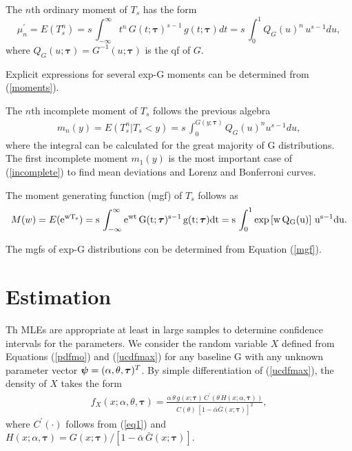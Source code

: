 \documentclass[12pt]{article}
\newcommand{\psin}{{\mbox{\boldmath $\psi$}}}
\begin{document}
The $n$th ordinary moment of $T_s$ has the form
\begin{equation}\label{moments}
\mu_n^{\prime}=E(T_s^n)=s\,\int_{-\infty}^{\infty} t^n\,G(t;\bm{\tau})^{s-1}\,g(t;\bm{\tau}) dt=s\,\int_{0}^{1} Q_G(u)^n\,u^{s-1} du,
\end{equation}
where $Q_G(u;\bm{\tau})=G^{-1}(u;\bm{\tau})$ is the qf of $G$.

Explicit expressions for several exp-G moments can be determined from (\ref{moments}).

The $n$th incomplete moment of $T_s$ follows the previous algebra
\begin{eqnarray}\label{incomplete}
m_{n}(y) = E(T_s^n|T_s<y)=s\,\int_{0}^{G(y;\bm{\tau})} Q_G(u)^n u^{s-1} du,
\end{eqnarray}
where the integral can be calculated for the great majority of G distributions. The first incomplete moment $m_{1}(y)$ is the
most important case of (\ref{incomplete}) to find mean deviations and Lorenz and Bonferroni curves.

The moment generating function (mgf) of $T_s$ follows as
\begin{equation}\label{mgf}
M(w)=E(\rm{e}^{w T_s})=s\,\int_{-\infty}^{\infty} \rm{e}^{w t}\,G(t;\bm{\tau})^{s-1}\,g(t;\bm{\tau}) dt=s\,\int_{0}^{1} \exp\left[w\, Q_G(u)\right]\,u^{s-1} du.
\end{equation}

The mgfs of exp-G distributions con be determined from Equation (\ref{mgf}).



\section{Estimation}\label{sec:estimation}

Th MLEs are appropriate at least in large samples to determine confidence intervals for the parameters.
We consider the random variable $X$ defined from Equations (\ref{pdfmo}) and (\ref{ucdfmax}) for
any baseline G with any unknown parameter vector $\psin =(\alpha,\theta,\bm{\tau})^{T}$.
By simple differentiation of (\ref{ucdfmax}), the density of $X$ takes the form
\begin{eqnarray}\label{maxdensity}
f_X(x;\alpha,\theta,\bm{\tau})=\frac{\alpha\,\theta\,g(x;\bm{\tau})\,C^{\prime}\left(\theta\,H(x;\alpha,\bm{\tau})\right)}{C(\theta)\,[1-\bar{\alpha}\bar{G}(x;\bm{\tau})]^2},
\end{eqnarray}
where $C^{\prime}(\cdot)$ follows from (\ref{eq1}) and
$H(x;\alpha,\bm{\tau})=G(x;\bm{\tau})/\left[1-\bar{\alpha}\,\bar{G}(x;\bm{\tau})\right]$.
\end{document}
